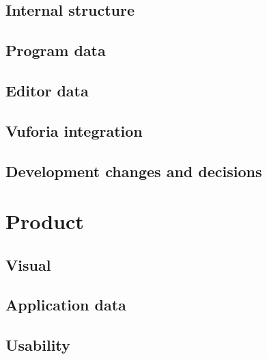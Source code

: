 \documentclass[BSP,english,oneside]{classes/gucthesis}
\begin{document}
	\newpage
	\section{Internal structure}
		\label{sec:internal_structure}
		

	\section{Program data}
		\label{sec:program_data}
		

	\newpage
	\section{Editor data}
		\label{sec:editor_data}
		

	\newpage
	\section{Vuforia integration}
		\label{sec:AR_library_integration}
		

	\section{Development changes and decisions}
		\label{sec:Developmentchangesanddecisions}
		


\chapter{Product}
	\label{chap:product}

	\section{Visual}
		\label{sec:visual}
		

	\section{Application data}
		\label{sec:application_data}
		

	\section{Usability}
		\label{sec:usability}
		
\end{document}
